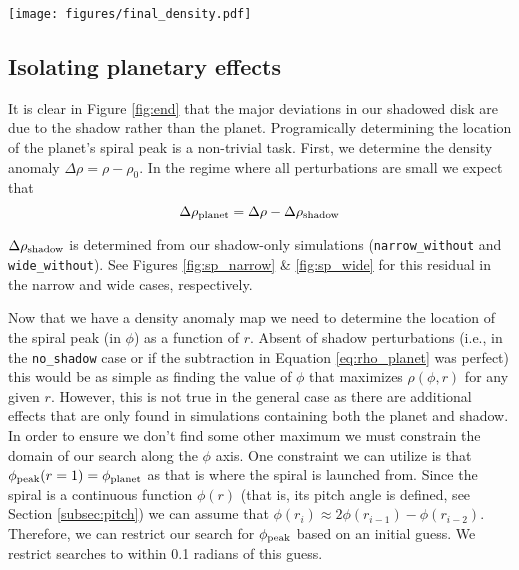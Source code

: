 \documentclass[twocolumn]{aastex631}
\begin{document}
\begin{figure*}
    \texttt{[image: figures/final\_density.pdf]}
    \caption{Final gas density anomaly maps for our five simulations. Note the patterns are dominated by
    the rings created by the shadow. The radial axis is scaled logarithmically.
    }
    \label{fig:end}
\end{figure*}

\subsection{Isolating planetary effects}
It is clear in Figure \ref{fig:end} that the major deviations in our shadowed disk are due to the shadow rather than the planet. Programically determining
the location of the planet's spiral peak is a non-trivial task. First, we determine the density anomaly $\Delta \rho = \rho - \rho_0$. In the regime where all perturbations
are small we expect that
\begin{equation}
    \Delta \rho_{\rm planet} = \Delta \rho - \Delta \rho_{\rm shadow}
    \label{eq:rho_planet}
\end{equation}

$\Delta \rho_{\rm shadow}$ is determined from our shadow-only simulations (\texttt{narrow\_without} and \texttt{wide\_without}). See Figures \ref{fig:sp_narrow}
\& \ref{fig:sp_wide} for this residual in the narrow and wide cases, respectively.

Now that we have a density anomaly map we need to determine the location of the spiral peak (in $\phi$) as a function of $r$. Absent of shadow perturbations
(i.e., in the \texttt{no\_shadow} case or if the subtraction in Equation \ref{eq:rho_planet} was perfect) this would be as simple as
finding the value of $\phi$ that maximizes $\rho(\phi,r)$ for any given $r$. However, this is not true in the general case as there are additional
effects that are only found in simulations containing both the planet and shadow. In order to ensure we don't find some other maximum we must constrain
the domain of our search along the $\phi$ axis. One constraint we can utilize is that $\phi_{\rm peak}(r=1) = \phi_{\rm planet}$ as that is where the spiral is
launched from. Since the spiral is a continuous function $\phi(r)$ (that is, its pitch angle is defined, see Section \ref{subsec:pitch}) we can assume that
$\phi(r_i) \approx 2\phi(r_{i-1}) - \phi(r_{i-2})$. Therefore, we can restrict our search for $\phi_{\rm peak}$ based on an initial guess. We restrict searches
to within 0.1 radians of this guess.
\end{document}
